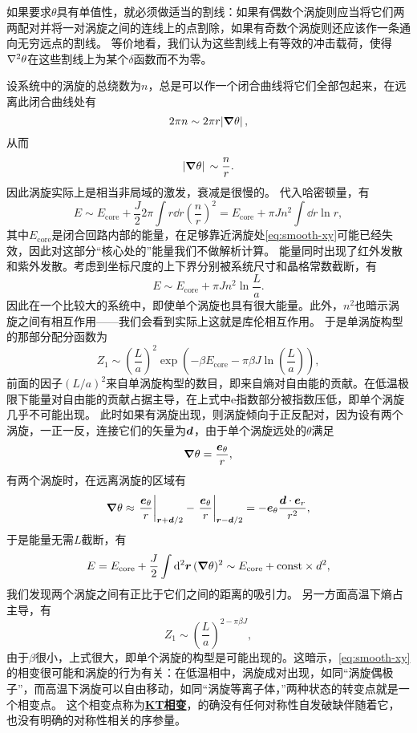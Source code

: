\documentclass[hyperref, UTF8, a4paper]{ctexart}
\newcommand*{\ee}{\mathrm{e}}
\newcommand*{\concept}[1]{\underline{\textbf{#1}}}
\begin{document}
如果要求$\theta$具有单值性，就必须做适当的割线：如果有偶数个涡旋则应当将它们两两配对并将一对涡旋之间的连线上的点割除，如果有奇数个涡旋则还应该作一条通向无穷远点的割线。
等价地看，我们认为这些割线上有等效的冲击载荷，使得$\laplacian{\theta}$在这些割线上为某个$\delta$函数而不为零。

设系统中的涡旋的总绕数为$n$，总是可以作一个闭合曲线将它们全部包起来，在远离此闭合曲线处有
\[
    2 \pi n \sim 2 \pi r \abs*{\grad{\theta}},
\]
从而
\[
    \abs*{\grad{\theta}} \sim \frac{n}{r}.
\]
因此涡旋实际上是相当非局域的激发，衰减是很慢的。
代入哈密顿量，有
\[
    E \sim E_\text{core} + \frac{J}{2} 2 \pi \int r \dd{r} \left( \frac{n}{r} \right)^2 = E_\text{core} + \pi J n^2 \int \dd{r} \ln r,
\]
其中$E_\text{core}$是闭合回路内部的能量，在足够靠近涡旋处\eqref{eq:smooth-xy}可能已经失效，因此对这部分“核心处的”能量我们不做解析计算。
能量同时出现了红外发散和紫外发散。考虑到坐标尺度的上下界分别被系统尺寸和晶格常数截断，有
\begin{equation}
    E \sim E_\text{core} + \pi J n^2 \ln \frac{L}{a}.
\end{equation}
因此在一个比较大的系统中，即使单个涡旋也具有很大能量。此外，$n^2$也暗示涡旋之间有相互作用——我们会看到实际上这就是库伦相互作用。
于是单涡旋构型的那部分配分函数为
\begin{equation}
    Z_1 \sim \left( \frac{L}{a} \right)^2 \exp(-\beta E_\text{core} - \pi \beta J \ln \left( \frac{L}{a} \right)),
\end{equation}
前面的因子$(L/a)^2$来自单涡旋构型的数目，即来自熵对自由能的贡献。在低温极限下能量对自由能的贡献占据主导，在上式中$\ee$指数部分被指数压低，即单个涡旋几乎不可能出现。
此时如果有涡旋出现，则涡旋倾向于正反配对，因为设有两个涡旋，一正一反，连接它们的矢量为$\vb*{d}$，由于单个涡旋远处的$\theta$满足
\[
    \grad{\theta} = \frac{\vb*{e}_\theta}{r},
\]
有两个涡旋时，在远离涡旋的区域有
\[
    \grad{\theta} \approx \eval{\frac{\vb*{e}_\theta}{r}}_{\vb*{r}+\vb*{d}/2} - \eval{\frac{\vb*{e}_\theta}{r}}_{\vb*{r}-\vb*{d}/2} = - \vb*{e}_\theta \frac{\vb*{d} \cdot \vb*{e}_r}{r^2}, 
\]
于是能量无需$L$截断，有
\[
    E = E_\text{core} + \frac{J}{2} \int \dd[2]{\vb*{r}} (\grad{\theta})^2 \sim E_\text{core} + \text{const} \times d^2,
\]
我们发现两个涡旋之间有正比于它们之间的距离的吸引力。
另一方面高温下熵占主导，有
\[
    Z_1 \sim \left( \frac{L}{a} \right)^{2-\pi \beta J},
\]
由于$\beta$很小，上式很大，即单个涡旋的构型是可能出现的。这暗示，\eqref{eq:smooth-xy}的相变很可能和涡旋的行为有关：在低温相中，涡旋成对出现，如同“涡旋偶极子”，而高温下涡旋可以自由移动，如同“涡旋等离子体，”两种状态的转变点就是一个相变点。
这个相变点称为\concept{KT相变}，的确没有任何对称性自发破缺伴随着它，也没有明确的对称性相关的序参量。
\end{document}

